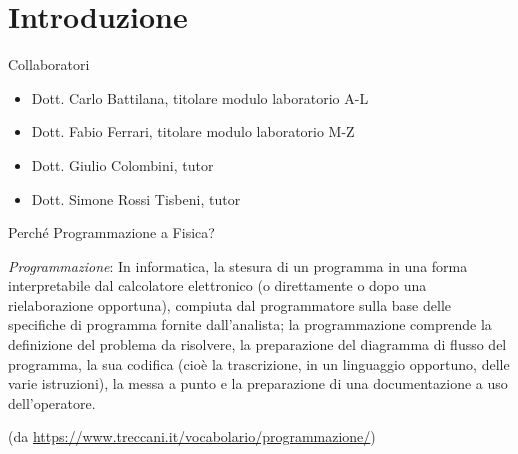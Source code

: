 
\section*{Introduzione}

\begin{frame}{Collaboratori}

  \begin{itemize}
  \item Dott. Carlo Battilana, titolare modulo laboratorio A-L
  \item Dott. Fabio Ferrari, titolare modulo laboratorio M-Z
  \item Dott. Giulio Colombini, tutor
  \item Dott. Simone Rossi Tisbeni, tutor
  \end{itemize}

\end{frame}

\begin{frame}{Perché Programmazione a Fisica?}

  \textit{Programmazione}: In informatica, la stesura di un programma in una
  forma interpretabile dal calcolatore elettronico (o direttamente o dopo una
  rielaborazione opportuna), compiuta dal programmatore sulla base delle
  specifiche di programma fornite dall'analista; la programmazione comprende la
  definizione del problema da risolvere, la preparazione del diagramma di flusso
  del programma, la sua codifica (cioè la trascrizione, in un linguaggio
  opportuno, delle varie istruzioni), la messa a punto e la preparazione di una
  documentazione a uso dell'operatore.

  {\tiny (da \url{https://www.treccani.it/vocabolario/programmazione/})}

\end{frame}

